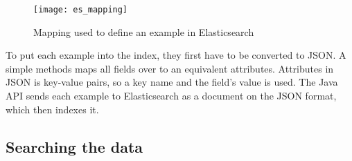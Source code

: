 \begin{figure}[h] 
\caption{Mapping used to define an example in Elasticsearch}
\centering
\texttt{[image: es\_mapping]}
\label{fig:es_mapping}
\end{figure}

To put each example into the index, they first have to be converted to JSON. A simple methods maps all fields over to an equivalent attributes. Attributes in JSON is key-value pairs, so a key name and the field's value is used. The Java API sends each example to Elasticsearch as a document on the JSON format, which then indexes it.

\subsection{Searching the data}


\cleardoublepage